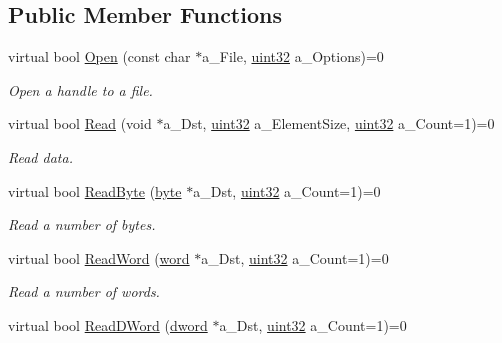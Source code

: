 \subsection*{Public Member Functions}
\begin{DoxyCompactItemize}
\item 
virtual bool \hyperlink{classtil_1_1_file_stream_a907973c36daaa764e0b898540ffc24e8}{Open} (const char $\ast$a\_\-File, \hyperlink{namespacetil_a20db61688ed403d11f057a508d87e54c}{uint32} a\_\-Options)=0
\begin{DoxyCompactList}\small\item\em Open a handle to a file. \item\end{DoxyCompactList}\item 
virtual bool \hyperlink{classtil_1_1_file_stream_a26c0a9cc315418ab156ee3a56aad1be2}{Read} (void $\ast$a\_\-Dst, \hyperlink{namespacetil_a20db61688ed403d11f057a508d87e54c}{uint32} a\_\-ElementSize, \hyperlink{namespacetil_a20db61688ed403d11f057a508d87e54c}{uint32} a\_\-Count=1)=0
\begin{DoxyCompactList}\small\item\em Read data. \item\end{DoxyCompactList}\item 
virtual bool \hyperlink{classtil_1_1_file_stream_aeddef50dcb9b7353799800cccf942551}{ReadByte} (\hyperlink{namespacetil_a5f3ec10aca1a788b495a0bd3787bc2dc}{byte} $\ast$a\_\-Dst, \hyperlink{namespacetil_a20db61688ed403d11f057a508d87e54c}{uint32} a\_\-Count=1)=0
\begin{DoxyCompactList}\small\item\em Read a number of bytes. \item\end{DoxyCompactList}\item 
virtual bool \hyperlink{classtil_1_1_file_stream_aada6e2d7cd5fe720527b09da42f78222}{ReadWord} (\hyperlink{namespacetil_a7903a6761ac6f7472530b2863401909e}{word} $\ast$a\_\-Dst, \hyperlink{namespacetil_a20db61688ed403d11f057a508d87e54c}{uint32} a\_\-Count=1)=0
\begin{DoxyCompactList}\small\item\em Read a number of words. \item\end{DoxyCompactList}\item 
virtual bool \hyperlink{classtil_1_1_file_stream_a0a4a3add4a7fa4fd46e5ae4b38dbd9d3}{ReadDWord} (\hyperlink{namespacetil_a9babb870ec6cf9716ed0c90ea12811af}{dword} $\ast$a\_\-Dst, \hyperlink{namespacetil_a20db61688ed403d11f057a508d87e54c}{uint32} a\_\-Count=1)=0

\end{DoxyCompactItemize}
